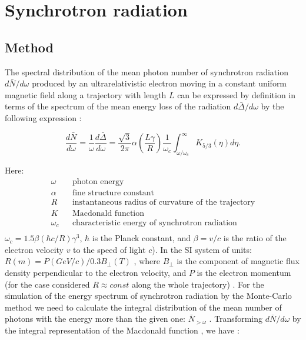 \chapter[Synchrotron radiation]{Synchrotron radiation}

\section{Method}

The spectral distribution of the mean photon number of synchrotron radiation   
$d\bar{N}/d\omega$ produced by an ultrarelativistic electron moving in a 
constant uniform magnetic field along a trajectory with length $L$ can be 
expressed by definition in terms of the spectrum of the mean energy loss of 
the radiation $d\bar{\Delta}/d\omega$  by the following expression \cite{maier}:

\begin{equation}
\frac{d\bar{N}}{d\omega} = \frac{1}{\omega}\frac{d\bar{\Delta}}{d\omega} = 
\frac{\sqrt{3}}{2\pi}\alpha\left(\frac{L\gamma}{R}\right)\frac{1}{\omega_{c}}
\int_{\omega/\omega_{c}}^{\infty}K_{5/3}(\eta)d\eta   .
\end{equation}

Here:    
\begin{eqnarray*}
\omega    &  &  \mbox{photon energy}\\   
\alpha    &  &  \mbox{fine structure constant}\\   
R         &  &  \mbox{instantaneous radius of curvature of the trajectory}\\ 
K         &  &  \mbox{Macdonald function}\\ 
\omega_c  &  &  \mbox{characteristic energy of synchrotron radiation}\\
\end{eqnarray*} 
$\omega_c = 1.5\beta(\hbar c/R)\gamma^3$, $\hbar$ is the Planck constant, 
and $\beta = v/c$  is the ratio of the electron velocity $v$  to the speed of 
light $c$). In the SI system of units: $R(m) = P(GeV/c)/0.3B_{\bot}(T)$ , 
where  $B_{\bot}$ is the component of magnetic flux density perpendicular to 
the electron velocity, and $P$  is the electron momentum (for the case 
considered $R \approx const$   along the whole trajectory) . For the 
simulation of the energy spectrum of synchrotron radiation by the Monte-Carlo 
method we need to calculate the integral distribution of the mean number of 
photons with the energy more than the given one: $\bar{N}_{>\omega}$  . 
Transforming  $d\bar{N}/d\omega$ by the integral representation of 
the Macdonald function \cite{abram}, we have :

